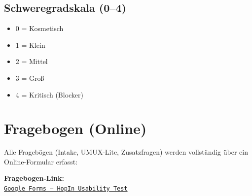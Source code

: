 \documentclass[11pt,a4paper]{article}
\begin{document}
\subsection*{Schweregradskala (0--4)}
\begin{itemize}
  \item 0 = Kosmetisch
  \item 1 = Klein
  \item 2 = Mittel
  \item 3 = Groß
  \item 4 = Kritisch (Blocker)
\end{itemize}


\section{Fragebogen (Online)}

Alle Fragebögen (Intake, UMUX-Lite, Zusatzfragen) werden vollständig über ein
Online-Formular erfasst:

\begin{center}
\textbf{\Large Fragebogen-Link:}\\[0.4em]
\href{https://docs.google.com/forms/d/e/1FAIpQLSeq4evKU9zZsHSYYnUkEXnRCRmGO6kjjN6b7OwLW9dnpswXyA/viewform}{\texttt{Google Forms – HopIn Usability Test}}
\end{center}
\end{document}

